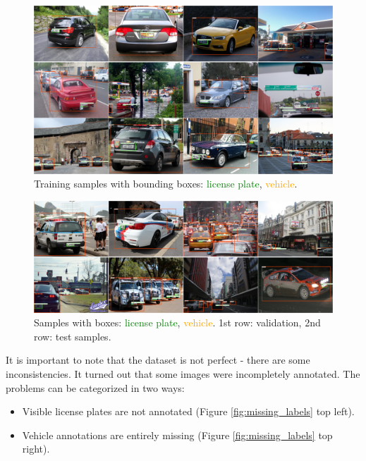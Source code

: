 \begin{figure}[H]
 \centerline{\includegraphics[width=1.0\columnwidth]{.//Figure/PlateLocalization/training_samples.png}}
 \caption{Training samples with bounding boxes: \textcolor{green}{license plate}, \textcolor{orange}{vehicle}.}
 \label{fig:training_samples}
\end{figure}

\begin{figure}[H]
 \centerline{\includegraphics[width=1.0\columnwidth]{.//Figure/PlateLocalization/validation_test_samples.png}}
 \caption{Samples with boxes: \textcolor{green}{license plate}, \textcolor{orange}{vehicle}. 1st row: validation, 2nd row: test samples.}
 \label{fig:validation_test_samples}
\end{figure}

It is important to note that the dataset is not perfect - there are some inconsistencies. It turned out that some images were incompletely annotated. The problems can be categorized in two ways:

\begin{itemize}
  \item Visible license plates are not annotated (Figure \ref{fig:missing_labels} top left).
  \item Vehicle annotations are entirely missing (Figure \ref{fig:missing_labels} top right).
\end{itemize}

